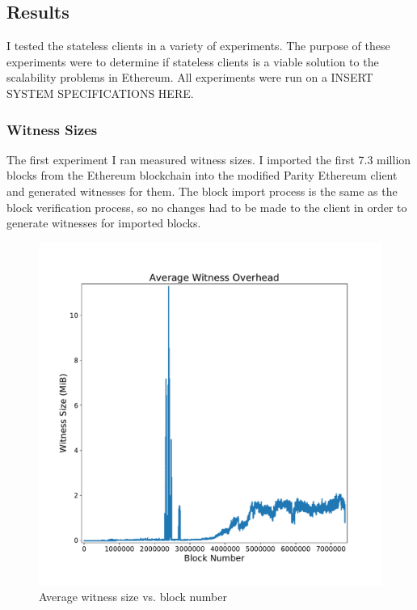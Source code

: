 \documentclass[12pt]{article}
\begin{document}
\subsection{Results}

I tested the stateless clients in a variety of experiments. The purpose of these experiments were to determine if stateless clients is a viable solution to the scalability problems in Ethereum. All experiments were run on a INSERT SYSTEM SPECIFICATIONS HERE.

\subsubsection{Witness Sizes}

The first experiment I ran measured witness sizes. I imported the first 7.3 million blocks from the Ethereum blockchain into the modified Parity Ethereum client and generated witnesses for them. The block import process is the same as the block verification process, so no changes had to be made to the client in order to generate witnesses for imported blocks.

\begin{figure}[H]
  \centering
  \includegraphics[width=\textwidth]{../figures/results/graphs/background/witness-size.pdf}
  \caption{Average witness size vs. block number}
  \label{fig:witnesssize}
\end{figure}
\end{document}
